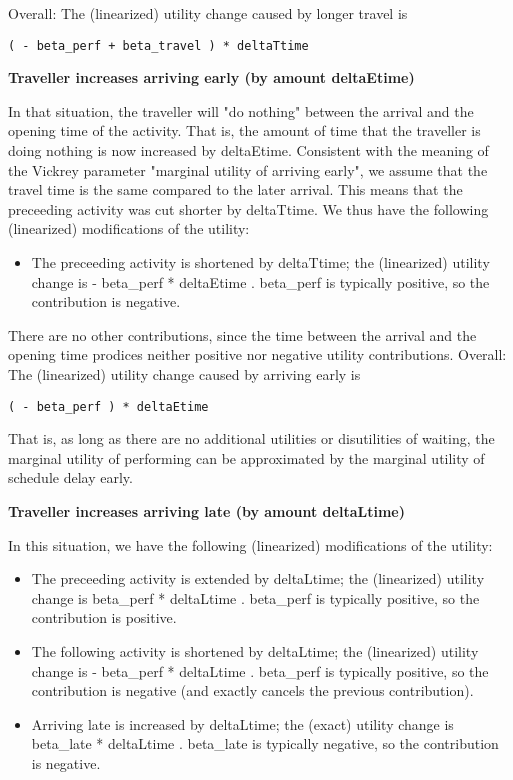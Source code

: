 Overall: The (linearized) utility change caused by longer travel is
\begin{verbatim}
( - beta_perf + beta_travel ) * deltaTtime

\end{verbatim}

\textbf{Traveller increases arriving early (by amount deltaEtime)}

In that situation, the traveller will "do nothing" between the  arrival and the opening time of the activity. That is, the amount  of time that the traveller is doing nothing is now increased by  deltaEtime. Consistent with the meaning of the Vickrey parameter  "marginal utility of arriving early", we assume that the travel time is  the same compared to the later arrival. This means that the preceeding  activity was cut shorter by deltaTtime. We thus have the following  (linearized) modifications of the utility:
\begin{itemize}
	\item The preceeding activity is shortened by deltaTtime; the  (linearized) utility change is - beta\_perf * deltaEtime .  beta\_perf is typically positive, so the contribution is negative.
\end{itemize}

There are no other contributions, since the time between the  arrival and the opening time prodices neither positive nor negative  utility contributions. Overall: The (linearized) utility change  caused by arriving early is
\begin{verbatim}
( - beta_perf ) * deltaEtime

\end{verbatim}That is, as long as there are no  additional utilities or disutilities of waiting, the marginal utility of  performing can be approximated by the marginal utility of schedule  delay early.

\textbf{Traveller increases arriving late (by amount deltaLtime)}

In this situation, we have the following (linearized) modifications of the utility:
\begin{itemize}
	\item The preceeding activity is extended by deltaLtime; the  (linearized) utility change is beta\_perf * deltaLtime . beta\_perf  is typically positive, so the contribution is positive.
	\item The following activity is shortened by deltaLtime; the (linearized)  utility change is - beta\_perf * deltaLtime . beta\_perf is  typically positive, so the contribution is negative (and exactly cancels  the previous contribution).
	\item Arriving late is increased by deltaLtime; the (exact) utility change  is beta\_late * deltaLtime . beta\_late is typically negative, so  the contribution is negative.
\end{itemize}

